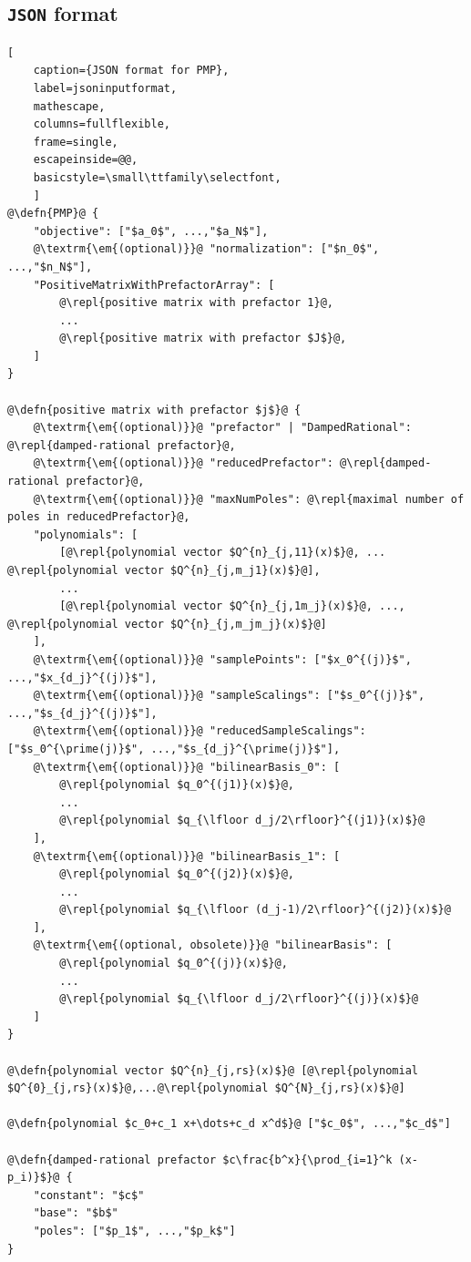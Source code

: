 \documentclass[12pt]{article}
\numberwithin{equation}{section}
\newcommand\repl[1]{$\langle$\textrm{\em #1}$\rangle$}
\newcommand\defn[1]{\textrm{\em #1}\ $\equiv$}
\begin{document}
\subsection{\texttt{JSON} format}
\begin{lstlisting}[
	caption={JSON format for PMP},
	label=jsoninputformat,
	mathescape,
	columns=fullflexible,
	frame=single,
	escapeinside=@@,
	basicstyle=\small\ttfamily\selectfont,
	]
@\defn{PMP}@ {
	"objective": ["$a_0$", ...,"$a_N$"],
	@\textrm{\em{(optional)}}@ "normalization": ["$n_0$", ...,"$n_N$"],
	"PositiveMatrixWithPrefactorArray": [
		@\repl{positive matrix with prefactor 1}@,
		...
		@\repl{positive matrix with prefactor $J$}@,
	]
}

@\defn{positive matrix with prefactor $j$}@ {
	@\textrm{\em{(optional)}}@ "prefactor" | "DampedRational": @\repl{damped-rational prefactor}@,
	@\textrm{\em{(optional)}}@ "reducedPrefactor": @\repl{damped-rational prefactor}@,
	@\textrm{\em{(optional)}}@ "maxNumPoles": @\repl{maximal number of poles in reducedPrefactor}@,
	"polynomials": [
		[@\repl{polynomial vector $Q^{n}_{j,11}(x)$}@, ... @\repl{polynomial vector $Q^{n}_{j,m_j1}(x)$}@],
		...
		[@\repl{polynomial vector $Q^{n}_{j,1m_j}(x)$}@, ..., @\repl{polynomial vector $Q^{n}_{j,m_jm_j}(x)$}@]
	],
	@\textrm{\em{(optional)}}@ "samplePoints": ["$x_0^{(j)}$", ...,"$x_{d_j}^{(j)}$"],
	@\textrm{\em{(optional)}}@ "sampleScalings": ["$s_0^{(j)}$", ...,"$s_{d_j}^{(j)}$"],
	@\textrm{\em{(optional)}}@ "reducedSampleScalings": ["$s_0^{\prime(j)}$", ...,"$s_{d_j}^{\prime(j)}$"],
	@\textrm{\em{(optional)}}@ "bilinearBasis_0": [
		@\repl{polynomial $q_0^{(j1)}(x)$}@,
		...
		@\repl{polynomial $q_{\lfloor d_j/2\rfloor}^{(j1)}(x)$}@
	],
	@\textrm{\em{(optional)}}@ "bilinearBasis_1": [
		@\repl{polynomial $q_0^{(j2)}(x)$}@,
		...
		@\repl{polynomial $q_{\lfloor (d_j-1)/2\rfloor}^{(j2)}(x)$}@
	],
	@\textrm{\em{(optional, obsolete)}}@ "bilinearBasis": [
		@\repl{polynomial $q_0^{(j)}(x)$}@,
		...
		@\repl{polynomial $q_{\lfloor d_j/2\rfloor}^{(j)}(x)$}@
	]
}
	
@\defn{polynomial vector $Q^{n}_{j,rs}(x)$}@ [@\repl{polynomial $Q^{0}_{j,rs}(x)$}@,...@\repl{polynomial $Q^{N}_{j,rs}(x)$}@]

@\defn{polynomial $c_0+c_1 x+\dots+c_d x^d$}@ ["$c_0$", ...,"$c_d$"]

@\defn{damped-rational prefactor $c\frac{b^x}{\prod_{i=1}^k (x-p_i)}$}@ {
	"constant": "$c$"
	"base": "$b$"
	"poles": ["$p_1$", ...,"$p_k$"]
}
\end{lstlisting}
\end{document}
